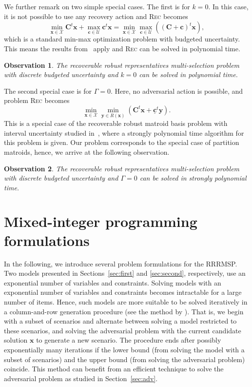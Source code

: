 \documentclass[a4paper,11pt,abstracton]{scrartcl}
\newtheorem{obs}{Observation}%
\theoremstyle{definition}
\theoremstyle{remark}
\newcommand{\X}{\mathcal{X}}
\newcommand{\cU}{\mathcal{U}}
\begin{document}
We further remark on two simple special cases. The first is for $k=0$. In this case, it is not possible to use any recovery action and \textsc{Rec} becomes
\[ \min_{\pmb{x}\in\X} \pmb{C}^t\pmb{x} + \max_{\pmb{c}\in\cU} \pmb{c}^t\pmb{x} 
=  \min_{\pmb{x}\in\X} \max_{\pmb{c}\in\cU} \left( (\pmb{C}+\pmb{c})^t \pmb{x} \right), \]
which is a standard min-max optimization problem with budgeted uncertainty. This means the results from~\cite{bertsimas2003robust} apply and \textsc{Rec} can be solved in polynomial time.

\begin{obs}\label{obs1}
The recoverable robust representatives multi-selection problem with discrete budgeted uncertainty and $k=0$ can be solved in polynomial time.
\end{obs}

The second special case is for $\Gamma = 0$. Here, no adversarial action is possible, and problem \textsc{Rec} becomes
\[ \min_{\pmb{x}\in\X} \min_{\pmb{y}\in R(\pmb{x})} (\pmb{C}^t\pmb{x} + \underline{\pmb{c}}^t \pmb{y}). \]
This is a special case of the recoverable robust matroid basis problem with interval uncertainty studied in~\cite{lendl2019matroid},
where a strongly polynomial time algorithm for this problem is given. Our problem corresponds to the special case of partition matroids, 
hence, we arrive at the following observation.

\begin{obs}\label{obs2}
The recoverable robust representatives multi-selection problem with discrete budgeted uncertainty and $\Gamma=0$ can be solved in strongly polynomial time.
\end{obs}


\section{Mixed-integer programming formulations}
\label{sec:mips}

In the following, we introduce several problem formulations for the RRRMSP. Two models presented in Sections~\ref{sec:first} and \ref{sec:second}, respectively, use an exponential number of variables and constraints. 
Solving models with an exponential number of variables and constraints becomes intractable for a large number of items. Hence, such models are more suitable to be solved iteratively in a column-and-row generation procedure (see the method by \cite{zeng2013solving}).
That is, we begin with a subset of scenarios and alternate between solving a model restricted to these scenarios, and solving the adversarial problem with the current candidate solution $\pmb{x}$ to generate a new scenario. The procedure ends after possibly exponentially many iterations if the lower bound (from solving the model with a subset of scenarios) and the upper bound (from solving the adversarial problem) coincide.  This method can benefit from an efficient technique to solve the adversarial problem as studied in Section~\ref{sec:adv}.
\end{document}
